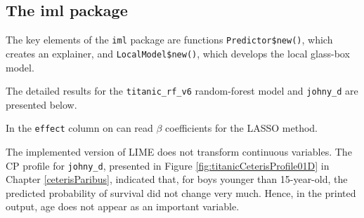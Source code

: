 \documentclass[]{krantz}
\newenvironment{Shaded}{\begin{snugshade}}{\end{snugshade}}
\newcommand{\CommentTok}[1]{\textcolor[rgb]{0.56,0.35,0.01}{\textit{#1}}}
\newcommand{\DataTypeTok}[1]{\textcolor[rgb]{0.13,0.29,0.53}{#1}}
\newcommand{\DecValTok}[1]{\textcolor[rgb]{0.00,0.00,0.81}{#1}}
\newcommand{\KeywordTok}[1]{\textcolor[rgb]{0.13,0.29,0.53}{\textbf{#1}}}
\newcommand{\NormalTok}[1]{#1}
\newcommand{\OperatorTok}[1]{\textcolor[rgb]{0.81,0.36,0.00}{\textbf{#1}}}
\newcommand{\StringTok}[1]{\textcolor[rgb]{0.31,0.60,0.02}{#1}}
\begin{document}
\hypertarget{the-iml-package}{%
\subsection{The iml package}\label{the-iml-package}}

The key elements of the \texttt{iml} package are functions \texttt{Predictor\$new()}, which creates an explainer, and \texttt{LocalModel\$new()}, which develops the local glass-box model.

The detailed results for the \texttt{titanic\_rf\_v6} random-forest model and \texttt{johny\_d} are presented below.

\begin{Shaded}
\end{Shaded}

In the \texttt{effect} column on can read \(\beta\) coefficients for the LASSO method.

The implemented version of LIME does not transform continuous variables. The CP profile for \texttt{johny\_d}, presented in Figure \ref{fig:titanicCeterisProfile01D} in Chapter \ref{ceterisParibus}, indicated that, for boys younger than 15-year-old, the predicted probability of survival did not change very much. Hence, in the printed output, age does not appear as an important variable.
\end{document}
